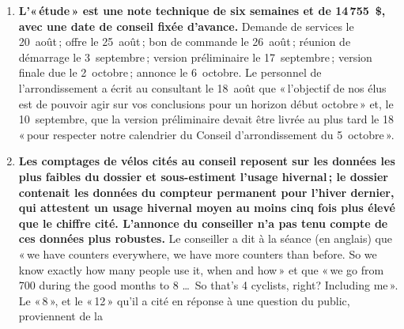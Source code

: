 \documentclass[10pt,letterpaper]{article}
\begin{document}
\begin{enumerate}[nosep,itemsep=0.3em,leftmargin=1.4em]
\begin{minipage}[t]{\linewidth}
    une piste cyclable bidirectionnelle d'un côté de Terrebonne, de Loyola à
    Côte-Saint-Luc, «\,qui respecte les normes minimales prévues par la loi\,»,
    et «\,le retour du stationnement d'un côté de la rue\,». Aucune mesure
    hivernale n'y figure. La demande de services, une semaine plus tard, a
    ajouté un Volet~1, le retrait des aménagements cyclables en hiver, à
    titre de «\,mesure transitoire pour l'hiver 2026--2027\,», avant le
    Volet~2, la piste bidirectionnelle permanente. La conversion hivernale
    annoncée le 6~octobre est la première étape d'une réduction à l'année de
    l'espace cyclable qui n'a jamais été divulguée au public.\end{minipage}\vspace{0.35em}
\item \begin{minipage}[t]{\linewidth}\textbf{L'«\,étude\,» est une note technique de six semaines et de
    14\,755~\$, avec une date de conseil fixée d'avance.} Demande de
    services le 20~août\,; offre le 25~août\,; bon de commande le 26~août\,;
    réunion de démarrage le 3~septembre\,; version préliminaire le
    17~septembre\,; version finale due le 2~octobre\,; annonce le 6~octobre. Le
    personnel de l'arrondissement a écrit au consultant le 18~août que
    «\,l'objectif de nos élus est de pouvoir agir sur vos conclusions pour un
    horizon début octobre\,» et, le 10~septembre, que la version préliminaire
    devait être livrée au plus tard le 18 «\,pour respecter notre calendrier
    du Conseil d'arrondissement du 5~octobre\,».\end{minipage}\vspace{0.35em}
\item \begin{minipage}[t]{\linewidth}\textbf{Les comptages de vélos cités au conseil reposent sur les
    données les plus faibles du dossier et sous-estiment l'usage
    hivernal\,; le dossier contenait les données du compteur permanent pour
    l'hiver dernier, qui attestent un usage hivernal moyen au moins cinq fois
    plus élevé que le chiffre cité. L'annonce du conseiller n'a pas tenu compte
    de ces données plus robustes.} Le conseiller a dit à la séance (en
    anglais) que «\,we have counters everywhere, we have more counters than
    before. So we know exactly how many people use it, when and how\,» et
    que «\,we go from 700 during the good months to 8 \ldots\ So that's 4
    cyclists, right? Including me\,». Le «\,8\,», et le «\,12\,» qu'il a cité
    en réponse à une question du public, proviennent de la

\end{minipage}
\end{enumerate}
\end{document}
